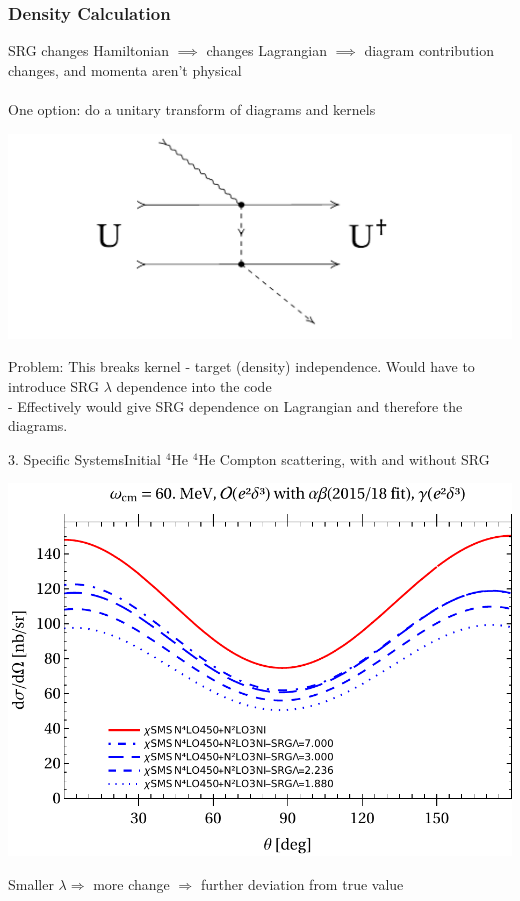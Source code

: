 \documentclass{beamer}
\newcommand{\HeF}{{}^{4} \mathrm{He}}
\begin{document}
\begin{frame}\frametitle{Density Calculation}
SRG changes Hamiltonian $\implies$ changes Lagrangian $\implies$ diagram contribution changes, and momenta aren't
physical\\~\\
One option: do a unitary transform of diagrams and kernels
\begin{center}
\includegraphics[scale=0.5]{UUdag.pdf}
\end{center}
Problem: This breaks kernel - target (density) independence. Would have to introduce SRG $\lambda$ dependence into the code\\
\qquad - Effectively would give SRG dependence on Lagrangian and therefore the diagrams.
\end{frame}




\begin{frame}{3. Specific Systems}{Initial $\HeF$}
$\HeF$ Compton scattering, with and without SRG
\begin{center}
    \includegraphics[scale=0.5]{4HeSRGCompare.pdf}
\end{center}
Smaller $\lambda \Rightarrow$ more change $\Rightarrow $ further deviation from true value
\end{frame}
\end{document}
